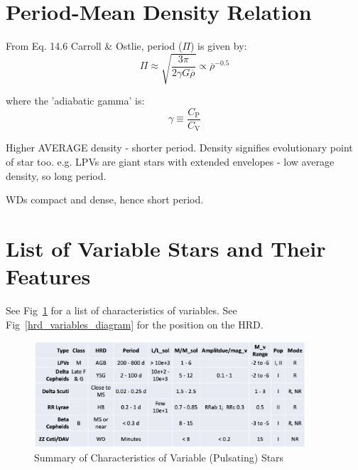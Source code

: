 \documentclass{spy}
\begin{document}
\section{Period-Mean Density Relation}
From Eq. 14.6 Carroll \& Ostlie, period (\(\Pi\)) is given by:
\begin{equation}
    \Pi \approx \sqrt{\frac{3 \pi}{2 \gamma G \overline{\rho}}}
    \propto \overline{\rho}^{-0.5}
\end{equation}

where the 'adiabatic gamma' is:
\begin{equation}
    \gamma \equiv \frac{C_\mathrm{P}}{C_\mathrm{V}}
\end{equation}

Higher AVERAGE density - shorter period. Density signifies evolutionary point of star too. 
e.g. LPVs are giant stars with extended envelopes - low average density, so long period.

WDs compact and dense, hence short period. 


\section{List of Variable Stars and Their Features}
See Fig~\ref{variables_list_table} for a list of characteristics of variables. See Fig~\ref{hrd_variables_diagram} for the position on the HRD.

\begin{figure}[h]
    \centering
    \includegraphics[width=0.9\textwidth]{variables_list.eps}
    \caption{Summary of Characteristics of Variable (Pulsating) Stars}   
    \label{variables_list_table}
\end{figure}
\end{document}
